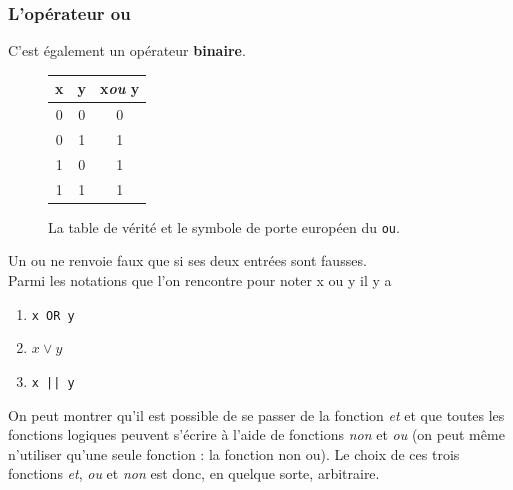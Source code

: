 \subsubsection*{L'opérateur \og ou\fg{}}

C'est également un opérateur \textbf{binaire}.

\begin{figure}[H]
    \begin{center}
        \begin{tabular}{|c|c|c|}
            \hline\rowcolor{UGLiOrange}
            {\boxfont\color{white}x} & {\boxfont\color{white}y} & {\boxfont\color{white}x\textit{ou} y} \\

            \hline
            0                        & 0                        & 0                                     \\
            \hline
            0                        & 1                        & 1                                     \\
            \hline
            1                        & 0                        & 1                                     \\
            \hline
            1                        & 1                        & 1                                     \\
            \hline
        \end{tabular}\hspace{3em}
    \end{center}
    \caption*{La table de vérité et le symbole de porte européen du \texttt{ou}.}
\end{figure}

Un \og ou\fg{} ne renvoie faux que si ses deux entrées sont fausses.\\
Parmi les notations que l'on rencontre pour noter \og x ou y\fg{} il y a
\begin{enumerate}[--]
    \item 	 \texttt{x OR y}
    \item 	$x\vee y$
    \item 	\texttt{x || y}
\end{enumerate}

On peut montrer qu'il est possible de se passer de la fonction \textit{et} et que toutes les fonctions logiques peuvent s'écrire à l'aide de
fonctions \textit{non} et \textit{ou} (on peut même n'utiliser qu'une seule fonction : la fonction \og non ou\fg{}). Le choix de ces trois fonctions
\textit{et}, \textit{ou} et \textit{non} est donc, en quelque sorte, arbitraire.

